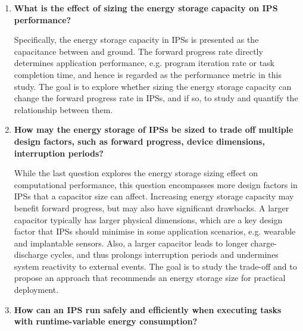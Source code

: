 \begin{enumerate}

\item \textbf{What is the effect of sizing the energy storage capacity on IPS performance?}

Specifically, the energy storage capacity in IPSs is presented as the capacitance between  and ground. 
The forward progress rate directly determines application performance, e.g. program iteration rate or task completion time, and hence is regarded as the performance metric in this study. 
The goal is to explore whether sizing the energy storage capacity can change the forward progress rate in IPSs, and if so, to study and quantify the relationship between them. 

\item \textbf{How may the energy storage of IPSs be sized to trade off multiple design factors, such as forward progress, device dimensions, interruption periods?}

While the last question explores the energy storage sizing effect on computational performance, this question encompasses more design factors in IPSs that a capacitor size can affect. 
Increasing energy storage capacity may benefit forward progress, but may also have significant drawbacks. 
A larger capacitor typically has larger physical dimensions, which are a key design factor that IPSs should minimise in some application scenarios, e.g. wearable and implantable sensors. 
Also, a larger capacitor leads to longer charge-discharge cycles, and thus prolongs interruption periods and undermines system reactivity to external events. 
The goal is to study the trade-off and to propose an approach that recommends an energy storage size for practical deployment.

\item \textbf{How can an IPS run safely and efficiently when executing tasks with runtime-variable energy consumption?}


\end{enumerate}
